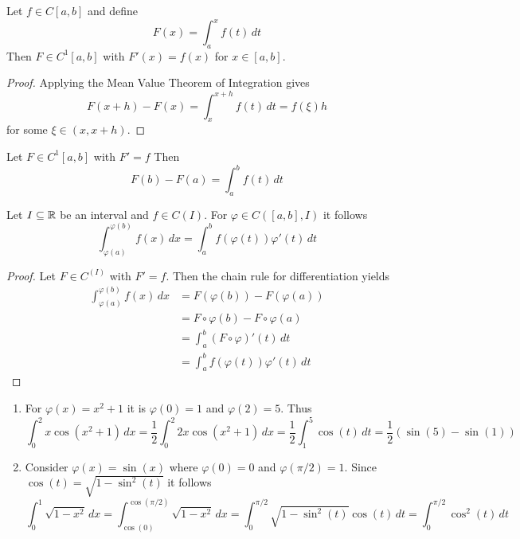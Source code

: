 \begin{theorem}\label{thm:differentiation}
Let \( f \in C[a,b] \) and define 
\[
    F(x) = \int_a^x f(t)\,dt
\]
Then \( F \in C^1[a,b] \) with \( F'(x) = f(x) \) for \( x \in [a,b] \).
\end{theorem}

\begin{proof}
Applying the Mean Value Theorem of Integration gives
\[
    F(x + h) - F(x) =  \int_x^{x + h} f(t)\,dt = f(\xi) h
\]
for some \( \xi \in (x, x + h) \).
\end{proof}
\bigskip

\begin{theorem}\label{thm:fund_calculus}
Let \( F \in C^1[a,b] \) with \( F' = f \)  Then
\[
    F(b) -F(a) = \int_a^b f(t)\,dt
\]
\end{theorem}
\bigskip


\begin{lemma}
Let \( I \subseteq \mathbb{R} \) be an interval and \( f \in C(I) \). For \( \varphi \in C([a,b], I) \) it follows
\[
	\int_{\varphi(a)}^{\varphi(b)} f(x)\,dx = \int_{a}^{b} f(\varphi(t))\varphi'(t)\,dt
\]
\end{lemma}
\begin{proof}
Let \( F \in C^(I) \) with \( F' = f \). Then the chain rule for differentiation yields
\[
	\begin{split}
		\int_{\varphi(a)}^{\varphi(b)} f(x)\,dx 
			&= F(\varphi(b)) - F(\varphi(a)) \\
			&= F\circ\varphi(b) - F\circ\varphi(a) \\
			&= \int_{a}^{b} (F\circ\varphi)'(t)\,dt \\
			&= \int_{a}^{b} f(\varphi(t))\varphi'(t)\,dt
	\end{split}

\]
\end{proof}
\bigskip

\begin{examples}\hfill
    \begin{enumerate}
        \item For \( \varphi(x) = x^2 + 1 \) it is \( \varphi(0) = 1 \) and \( \varphi(2) = 5 \). Thus
			\[
				\int_0^2 x\cos(x^2 + 1)\,dx = 
					\frac{1}{2} \int_0^2 2x\cos(x^2 + 1)\,dx =
					\frac{1}{2} \int_1^5 \cos(t)\,dt =
					\frac{1}{2} (\sin(5) - \sin(1))
			\]
        \item Consider \( \varphi(x) = \sin(x) \) where \( \varphi(0) = 0 \) and \( \varphi(\pi / 2) = 1 \). 
			Since \( \cos(t) = \sqrt{1 - \sin^2(t) }\) it follows
			\[
				\int_0^1 \sqrt{1 - x^2}\,dx =
					\int_{\cos(0)}^{\cos(\pi/2)} \sqrt{1 - x^2}\,dx = 
					\int_0^{\pi/2} \sqrt{1 - \sin^2(t)}\cos(t)\,dt = 
					\int_0^{\pi/2} \cos^2(t)\,dt
			\]
    \end{enumerate}
\end{examples}
\bigskip



